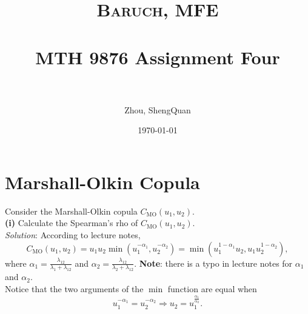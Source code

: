 \documentclass[paper=a4, fontsize=11pt]{scrartcl} %
\title{	
\normalfont \normalsize 
\textsc{Baruch, MFE} \\ [25pt] %
\horrule{0.5pt} \\[0.4cm] %
\huge MTH 9876 Assignment Four\\  %
\horrule{2pt} \\[0.5cm] %
}
\author{Zhou, ShengQuan} %
\date{\normalsize\today} %
\numberwithin{equation}{section} %
\numberwithin{figure}{section} %
\numberwithin{table}{section} %
\begin{document}
	


\maketitle %

\newpage



\section{Marshall-Olkin Copula}
Consider the Marshall-Olkin copula $C_{\text{MO}}(u_1,u_2)$.\\

\textbf{(i)} Calculate the Spearman's rho of $C_{\text{MO}}(u_1,u_2)$.\\
\textit{Solution}: According to lecture notes,
$$
C_{\text{MO}}(u_1,u_2) = u_1 u_2\min\left( u_1^{-\alpha_1}, u_2^{-\alpha_2} \right)
= \min\left( u_1^{1-\alpha_1}u_2, u_1 u_2^{1-\alpha_2} \right),
$$
where $\alpha_1 = \frac{\lambda_{12}}{\lambda_1 +\lambda_{12}}$ and $\alpha_2 = \frac{\lambda_{12}}{\lambda_2 +\lambda_{12}}$. \textbf{Note}: there is
a typo in lecture notes for $\alpha_1$ and $\alpha_2$.\\

Notice that
the two arguments of the $\min$ function are equal when
$$
u_1^{-\alpha_1} = u_2^{-\alpha_2} \Rightarrow u_2 = u_1^{\frac{\alpha_1}{\alpha_2}}.
$$
\end{document}
